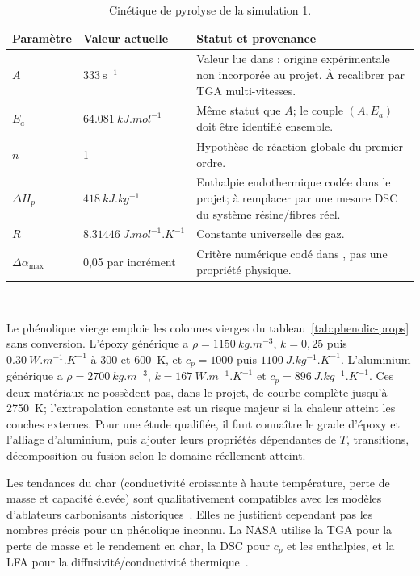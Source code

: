 \documentclass[oneside,openany]{amsdtx}
\begin{document}
\begin{table}[H]
\centering
\small
\renewcommand{\arraystretch}{1.15}
\begin{tabular}{L{0.22\textwidth}M{0.20\textwidth}L{0.47\textwidth}}
\toprule
\textbf{Paramètre} & \textbf{Valeur actuelle} & \textbf{Statut et provenance} \\
\midrule
\(A\) & \(333\ \mathrm{s^{-1}}\) & Valeur lue dans
; origine expérimentale non incorporée au
projet. À recalibrer par TGA multi-vitesses. \\
\(E_a\) & \(\SI{64.081}{kJ.mol^{-1}}\) & Même statut que \(A\); le couple
\((A,E_a)\) doit être identifié ensemble. \\
\(n\) & 1 & Hypothèse de réaction globale du premier ordre. \\
\(\Delta H_p\) & \(\SI{418}{kJ.kg^{-1}}\) & Enthalpie endothermique codée dans
le projet; à remplacer par une mesure DSC du système résine/fibres réel. \\
\(R\) & \(\SI{8.31446}{J.mol^{-1}.K^{-1}}\) & Constante universelle des gaz. \\
\(\Delta\alpha_\mathrm{max}\) & 0,05 par incrément & Critère numérique codé dans
, pas une propriété physique. \\
\bottomrule
\end{tabular}~\\[1em]
\caption{Cinétique de pyrolyse de la simulation 1.}
\label{tab:kinetics}
\end{table}

Le phénolique vierge  emploie les colonnes vierges du
tableau~\ref{tab:phenolic-props} sans conversion. L'époxy générique a
\(\rho=\SI{1150}{kg.m^{-3}}\), \(k=0{,}25\) puis
\(\SI{0.30}{W.m^{-1}.K^{-1}}\) à 300 et \SI{600}{K}, et \(c_p=1000\) puis
\(\SI{1100}{J.kg^{-1}.K^{-1}}\). L'aluminium générique a
\(\rho=\SI{2700}{kg.m^{-3}}\), \(k=\SI{167}{W.m^{-1}.K^{-1}}\) et
\(c_p=\SI{896}{J.kg^{-1}.K^{-1}}\). Ces deux matériaux ne possèdent pas, dans
le projet, de courbe complète jusqu'à \SI{2750}{K}; l'extrapolation constante
est un risque majeur si la chaleur atteint les couches externes. Pour une étude
qualifiée, il faut connaître le grade d'époxy et l'alliage d'aluminium, puis
ajouter leurs propriétés dépendantes de \(T\), transitions, décomposition ou
fusion selon le domaine réellement atteint.

Les tendances du char (conductivité croissante à haute température, perte de
masse et capacité élevée) sont qualitativement compatibles avec les modèles
d'ablateurs carbonisants historiques~\cite{clark1972,ewing2013}. Elles ne
justifient cependant pas les nombres précis pour un phénolique inconnu. La NASA
utilise la TGA pour la perte de masse et le rendement en char, la DSC pour
\(c_p\) et les enthalpies, et la LFA pour la diffusivité/conductivité
thermique~\cite{nasa-testing}.
\end{document}
